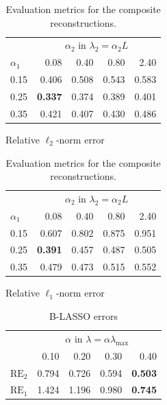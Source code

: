         \begin{table}[b]
        \centering
        \begin{subtable}[t]{0.45\linewidth}
            \centering
            \begin{tabular}{l|rrrr}
                \toprule
                 & \multicolumn{4}{c}{$\alpha_2$ in $\lambda_2 = \alpha_2 L$} \\
                \cmidrule(lr){2-5}
                $\alpha_1$ & 0.08 & 0.40 & 0.80 & 2.40 \\
                \midrule
                0.15 & 0.406 & 0.508 & 0.543 & 0.583 \\
                0.25 & \textbf{0.337} & 0.374 & 0.389 & 0.401 \\
                0.35 & 0.421 & 0.407 & 0.430 & 0.486 \\
                \bottomrule
            \end{tabular}
            \caption{Relative $\ell_2$-norm error \label{tab:rl2}}
        \end{subtable}
        \hfill
        \begin{subtable}[t]{0.45\linewidth}
            \centering
            \begin{tabular}{l|rrrr}
                \toprule
                 & \multicolumn{4}{c}{$\alpha_2$ in $\lambda_2 = \alpha_2 L$} \\
                \cmidrule(lr){2-5}
                $\alpha_1$ & 0.08 & 0.40 & 0.80 & 2.40 \\
                \midrule
                0.15 & 0.607 & 0.802 & 0.875 & 0.951 \\
                0.25 & \textbf{0.391} & 0.457 & 0.487 & 0.505 \\
                0.35 & 0.479 & 0.473 & 0.515 & 0.552 \\
                \bottomrule
            \end{tabular}
            \caption{Relative $\ell_1$-norm error\label{tab:rl1}}
        \end{subtable}
        \caption{Evaluation metrics for the composite reconstructions.}
        \end{table}
    
        \begin{table}[b]
            \centering
            \begin{tabular}{l|rrrr}
                \toprule
                 & \multicolumn{4}{c}{$\alpha$ in $\lambda = \alpha \lambda_{\mathrm{max}}$} \\
                \cmidrule(lr){2-5}
                 & 0.10 & 0.20 & 0.30 & 0.40 \\
                \midrule
                $\mathrm{RE}_2$ & 0.794 & 0.726 & 0.594 & \textbf{0.503} \\
                $\mathrm{RE}_1$ & 1.424 & 1.196 & 0.980 & \textbf{0.745} \\
                \bottomrule
            \end{tabular}
            \caption{B-LASSO errors \label{tab:blasso}}
        \end{table}

